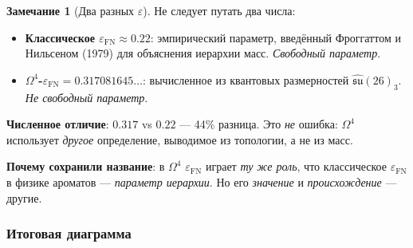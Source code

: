 \documentclass[11pt,a4paper]{article}
\newcommand{\Om}{\ensuremath{\Omega^4}}
\newcommand{\epsFN}{\ensuremath{\varepsilon_{\text{FN}}}}
\theoremstyle{definition}
\newtheorem{remark}[theorem]{Замечание}
\begin{document}
\begin{remark}[Два разных $\varepsilon$]
\label{rem:two-epsilons}
Не следует путать два числа:
\begin{itemize}
    \item \textbf{Классическое $\varepsilon_{\text{FN}} \approx 0.22$}:
          эмпирический параметр, введённый Фроггаттом и Нильсеном
          (1979) для объяснения иерархии масс. \emph{Свободный параметр}.
    \item \textbf{$\Om$-$\epsFN = 0.317081645\ldots$}:
          вычисленное из квантовых размерностей $\hat{\mathfrak{su}}(26)_3$.
          \emph{Не свободный параметр}.
\end{itemize}

\textbf{Численное отличие}: $0.317$ vs $0.22$ --- 44\% разница.
Это \emph{не} ошибка: $\Om$ использует \emph{другое}
определение, выводимое из топологии, а не из масс.

\textbf{Почему сохранили название}: в $\Om$ $\epsFN$
играет \emph{ту же роль}, что классическое $\varepsilon_{\text{FN}}$
в физике ароматов --- \emph{параметр иерархии}. Но его \emph{значение}
и \emph{происхождение} --- другие.
\end{remark}

\subsubsection{Итоговая диаграмма}
\end{document}
